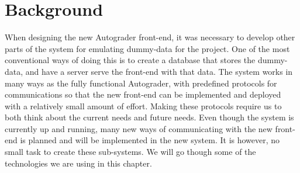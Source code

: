 \chapter{Background}
When designing the new Autograder front-end, it was necessary to develop other parts of the system for emulating dummy-data for the project. One of the most conventional ways of doing this is to create a database that stores the dummy-data, and have a server serve the front-end with that data. The system works in many ways as the fully functional Autograder, with predefined protocols for communications so that the new front-end can be implemented and deployed with a relatively small amount of effort. Making these protocols require us to both think about the current needs and future needs. Even though the system is currently up and running, many new ways of communicating with the new front-end is planned and will be implemented in the new system. It is however, no small task to create these sub-systems. We will go though some of the technologies we are using in this chapter.

